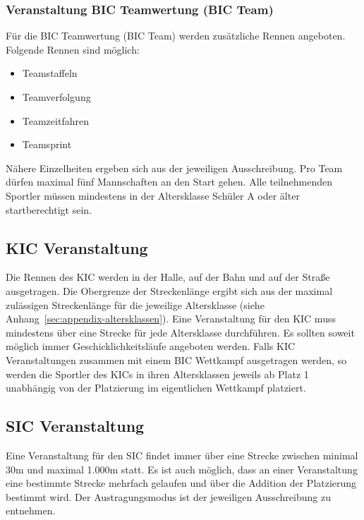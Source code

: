 \subsubsection{Veranstaltung BIC Teamwertung (BIC Team)}
Für die BIC Teamwertung (BIC Team) werden zusätzliche Rennen angeboten. Folgende Rennen sind möglich:
\begin{itemize}
	\item Teamstaffeln
	\item Teamverfolgung
	\item Teamzeitfahren
	\item Teamsprint
\end{itemize}
Nähere Einzelheiten ergeben sich aus der jeweiligen Ausschreibung. Pro Team dürfen maximal fünf Mannschaften an den Start gehen. Alle teilnehmenden Sportler müssen mindestens in der Altersklasse Schüler A oder älter startberechtigt sein.

\subsection{KIC Veranstaltung}
Die Rennen des KIC werden in der Halle, auf der Bahn und auf der Straße ausgetragen. Die Obergrenze der Streckenlänge ergibt sich aus der maximal zulässigen Streckenlänge für die jeweilige Altersklasse (siehe Anhang~\ref{sec:appendix-altersklassen}). Eine Veranstaltung für den KIC muss mindestens über eine Strecke für jede Altersklasse durchführen. Es sollten soweit möglich immer Geschicklichkeitsläufe angeboten werden. Falls KIC Veranstaltungen zusammen mit einem BIC Wettkampf ausgetragen werden, so werden die Sportler des KICs in ihren Altersklassen jeweils ab Platz 1 unabhängig von der Platzierung im eigentlichen Wettkampf platziert.

\subsection{SIC Veranstaltung}
Eine Veranstaltung für den SIC findet immer über eine Strecke zwischen minimal 30m und maximal 1.000m statt. Es ist auch möglich, dass an einer Veranstaltung eine bestimmte Strecke mehrfach gelaufen und über die Addition der Platzierung bestimmt wird. Der Austragungsmodus ist der jeweiligen Ausschreibung zu entnehmen.
